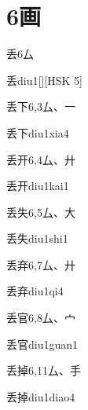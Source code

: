 
\section*{6画}

\begin{Entry}{丢}{6}{⼛}
  \begin{Phonetics}{丢}{diu1}[][HSK 5]
  \end{Phonetics}
\end{Entry}

\begin{Entry}{丢下}{6,3}{⼛、⼀}
  \begin{Phonetics}{丢下}{diu1xia4}
  \end{Phonetics}
\end{Entry}

\begin{Entry}{丢开}{6,4}{⼛、⼶}
  \begin{Phonetics}{丢开}{diu1kai1}
  \end{Phonetics}
\end{Entry}

\begin{Entry}{丢失}{6,5}{⼛、⼤}
  \begin{Phonetics}{丢失}{diu1shi1}
  \end{Phonetics}
\end{Entry}

\begin{Entry}{丢弃}{6,7}{⼛、⼶}
  \begin{Phonetics}{丢弃}{diu1qi4}
  \end{Phonetics}
\end{Entry}

\begin{Entry}{丢官}{6,8}{⼛、⼧}
  \begin{Phonetics}{丢官}{diu1guan1}
  \end{Phonetics}
\end{Entry}

\begin{Entry}{丢掉}{6,11}{⼛、⼿}
  \begin{Phonetics}{丢掉}{diu1diao4}
  \end{Phonetics}
\end{Entry}

